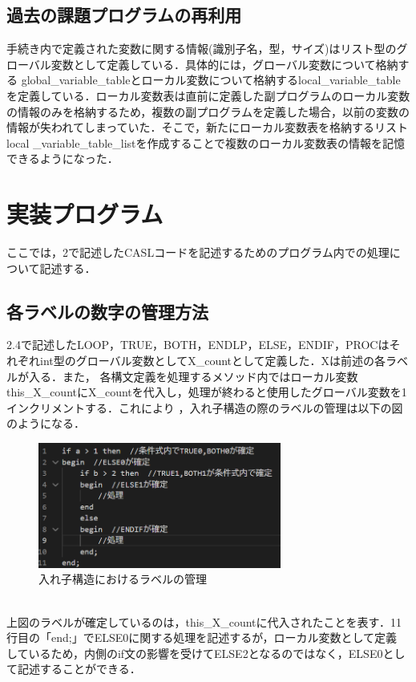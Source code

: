\documentclass[dvipdfmx]{jarticle}
\begin{document}
\subsection{過去の課題プログラムの再利用}
手続き内で定義された変数に関する情報(識別子名，型，サイズ)はリスト型のグローバル変数として定義している．具体的には，グローバル変数について格納する
global\_variable\_tableとローカル変数について格納するlocal\_variable\_tableを定義している．ローカル変数表は直前に定義した副プログラムのローカル変数
の情報のみを格納するため，複数の副プログラムを定義した場合，以前の変数の情報が失われてしまっていた．そこで，新たにローカル変数表を格納するリストlocal
\_variable\_table\_listを作成することで複数のローカル変数表の情報を記憶できるようになった．
\section{実装プログラム}
ここでは，2で記述したCASLコードを記述するためのプログラム内での処理について記述する．
\subsection{各ラベルの数字の管理方法}
2.4で記述したLOOP，TRUE，BOTH，ENDLP，ELSE，ENDIF，PROCはそれぞれint型のグローバル変数としてX\_countとして定義した．Xは前述の各ラベルが入る．また，
各構文定義を処理するメソッド内ではローカル変数this\_X\_countにX\_countを代入し，処理が終わると使用したグローバル変数を1インクリメントする．これにより
，入れ子構造の際のラベルの管理は以下の図のようになる．
\begin{figure}[h]
  \centering
  \includegraphics[width = 8cm]{ireko.png}
  \caption{入れ子構造におけるラベルの管理}
\end{figure}
\\上図のラベルが確定しているのは，this\_X\_countに代入されたことを表す．11行目の「end;」でELSE0に関する処理を記述するが，ローカル変数として定義
しているため，内側のif文の影響を受けてELSE2となるのではなく，ELSE0として記述することができる．
\end{document}
